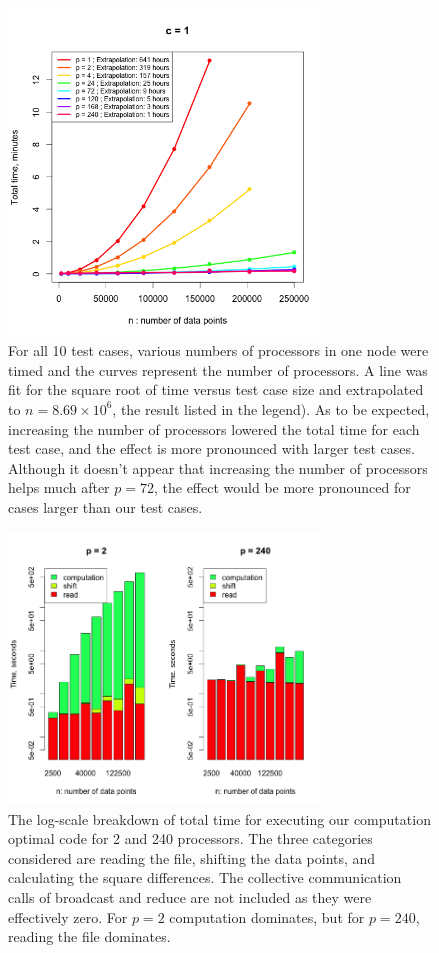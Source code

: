 \begin{figure}[!h]
   \centering
   \includegraphics[width=0.75\textwidth]{./fig/timing.png} %
   \caption{For all 10 test cases, various numbers of processors in one node were timed and the curves represent the number of processors. A line was fit for the square root of time versus test case size and extrapolated to $n=8.69\times10^6$, the result listed in the legend). As to be expected, increasing the number of processors lowered the total time for each test case, and the effect is more pronounced with larger test cases. Although it doesn't appear that increasing the number of processors helps much after $p=72$, the effect would be more pronounced for cases larger than our test cases. }
   \label{fig:comp_timings}
\end{figure}

\begin{figure}[!h]
   \centering
   \includegraphics[width=0.75\textwidth]{./fig/comp_breakdown.png} %
   \caption{The log-scale breakdown of total time for executing our computation optimal code for 2 and 240 processors. The three categories considered are reading the file, shifting the data points, and calculating the square differences. The collective communication calls of broadcast and reduce are not included as they were effectively zero. For $p=2$ computation dominates, but for $p=240$, reading the file dominates.}
   \label{fig:comp_breakdown}
\end{figure}

